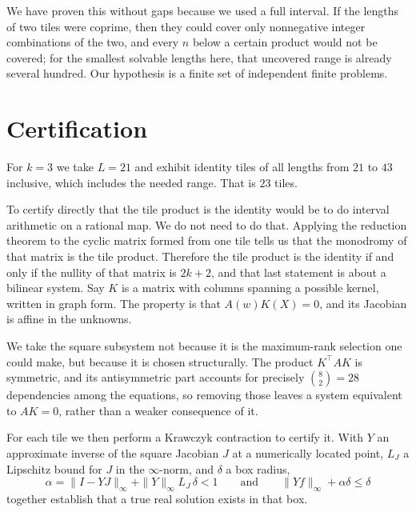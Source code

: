 \documentclass[11pt]{article}
\theoremstyle{definition}
\begin{document}
We have proven this without gaps because we used a full interval. If the lengths
of two tiles were coprime, then they could cover only nonnegative integer
combinations of the two, and every $n$ below a certain product would not be
covered; for the smallest solvable lengths here, that uncovered range is already
several hundred. Our hypothesis is a finite set of independent finite problems.

\section{Certification}\label{sec:cert}

For $k=3$ we take $L=21$ and exhibit identity tiles of all lengths from $21$ to
$43$ inclusive, which includes the needed range. That is $23$ tiles.

To certify directly that the tile product is the identity would be to do
interval arithmetic on a rational map. We do not need to do that. Applying the
reduction theorem to the cyclic matrix formed from one tile tells us that the
monodromy of that matrix is the tile product. Therefore the tile product is the
identity if and only if the nullity of that matrix is $2k+2$, and that last
statement is about a bilinear system. Say $K$ is a matrix with columns spanning
a possible kernel, written in graph form. The property is that $A(w)K(X)=0$, and
its Jacobian is affine in the unknowns.

We take the square subsystem not because it is the maximum-rank selection one
could make, but because it is chosen structurally. The product
$K^{\!\top}\!AK$ is symmetric, and its antisymmetric part accounts for precisely
$\binom{8}{2}=28$ dependencies among the equations, so removing those leaves a
system equivalent to $AK=0$, rather than a weaker consequence of it.

For each tile we then perform a Krawczyk contraction to certify it. With $Y$ an
approximate inverse of the square Jacobian $J$ at a numerically located point,
$L_{\!J}$ a Lipschitz bound for $J$ in the $\infty$-norm, and $\delta$ a box
radius,
\[
  \alpha=\|I-YJ\|_\infty+\|Y\|_\infty L_{\!J}\,\delta<1
  \qquad\text{and}\qquad
  \|Yf\|_\infty+\alpha\delta\le\delta
\]
together establish that a true real solution exists in that box.
\end{document}
